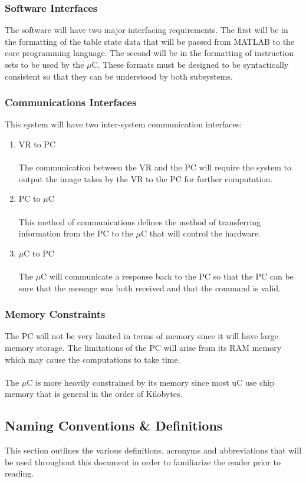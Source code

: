 \documentclass[titlepage]{article}
\begin{document}
\subsubsection{Software Interfaces}
The software will have two major interfacing requirements. The first will be in the formatting of the table state data that will be passed from MATLAB to the core programming language. The second will be in the formatting of instruction sets to be used by the $\mu$C. These formats must be designed to be syntactically consistent so that they can be understood by both subsystems.
\subsubsection{Communications Interfaces}
This system will have two inter-system communication interfaces:
\begin{enumerate}
	\item VR to PC\\\\
	The communication between the VR and the PC will require the system to output the image takes by the VR to the PC for further computation.
	\item PC to $\mu$C\\\\
	This method of communications defines the method of transferring information from the PC to the $\mu$C that will control the hardware.
	\item $\mu$C to PC\\\\
	The $\mu$C will communicate a response back to the PC so that the PC can be sure that the message was both received and that the command is valid.
\end{enumerate}
\subsubsection{Memory Constraints}
The PC will not be very limited in terms of memory since it will have large memory storage. The limitations of the PC will arise from its RAM memory which may cause the computations to take time.\\\\
The $\mu$C is more heavily constrained by its memory since most uC use chip memory that is general in the order of Kilobytes.
 
\subsection{Naming Conventions \& Definitions}
This section outlines the various definitions, acronyms and abbreviations that will be used throughout this document in order to familiarize the reader prior to reading.
\end{document}
